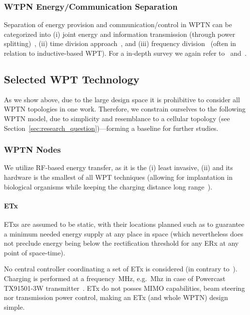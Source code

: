 \documentclass[11pt,draftclsnofoot,journal,onecolumn]{IEEEtran}
\begin{document}
\subsubsection{WTPN Energy/Communication Separation}

Separation of energy provision and communication/control in WPTN can be categorized into (i) joint energy and information transmission (through power splitting)~\cite{timotheou_twc_2014,liu_tcom_2013,huang_arxiv_2012}, (ii) time division approach~\cite{ju_twc_2014,liu_net_2014}, and (iii) frequency division~\cite{xiang_pimrc_2013,wang_tmc_2014} (often in relation to inductive-based WPT). For a in-depth survey we again refer to~\cite[Sec. III-E]{lu_arxiv_2014} and~\cite{bi:2014:arxiv}.

\subsection{Selected WPT Technology}

As we show above, due to the large design space it is prohibitive to consider all WPTN topologies in one work. Therefore, we constrain ourselves to the following WPTN model, due to simplicity and resemblance to a cellular topology (see Section~\ref{sec:research_question})---forming a baseline for further studies.

\subsubsection{WPTN Nodes}

We utilize RF-based energy transfer, as it is the (i) least invasive, (ii) and its hardware is the smallest of all WPT techniques (allowing for implantation in biological organisms while keeping the charging distance long range~\cite{holleman_biocas_2008}).

\paragraph{ETx}
\label{sec:etx}

ETxs are assumed to be static, with their locations planned such as to guarantee a minimum needed energy supply at any place in space (which nevertheless does not preclude energy being below the rectification threshold for any ERx at any point of space-time).

No central controller coordinating a set of ETx is considered (in contrary to~\cite[Sec. III]{chiu_apnoms_2012}). Charging is performed at a frequency \,MHz, e.g. \,Mhz in case of Powercast TX91501-3W transmitter~\cite[/products/powercaster-transmitters]{powercast_website}. ETx do not posses MIMO capabilities, beam steering nor transmission power control, making an ETx (and whole WPTN) design simple.
\end{document}
